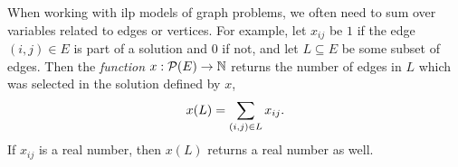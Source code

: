 When working with \gls{ilp} models of graph problems, we often need to sum over variables
related to edges or vertices. For example, let $x_{ij}$ be $1$ if the edge $(i,j) \in E$
is part of a solution and $0$ if not, and let $L \subseteq E$ be some subset of edges.
Then the \textit{function} $x : \mathcal{P} (E) \to \mathbb{N}$ returns the number of edges
 in $L$ which was selected in the solution defined by $x$,
 $$x(L) = \sum_{(i, j) \in L} x_{ij}\mathnormal{.}$$
 If $x_{ij}$ is a real number, then $x(L)$ returns a real number as well.

\clearpage
\glsaddall
\printglossaries

